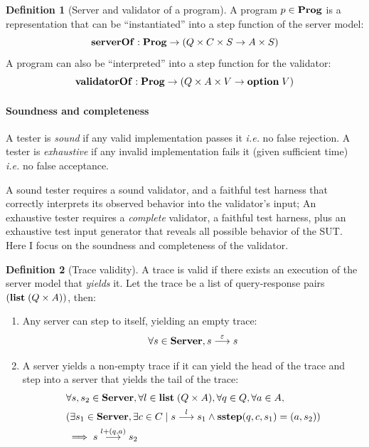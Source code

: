 \documentclass{article}
\theoremstyle{definition}
\newtheorem{definition}{Definition}
\newcommand{\Server}{\ottkw{Server}}
\newcommand{\sstep}{\ottkw{sstep}}
\newcommand{\option}{\ottkw{option}\;}
\newcommand{\List}{\ottkw{list}\;}
\newcommand{\nil}{\varepsilon}
\newcommand{\yields}[3]{#1\overset{#2}{\longrightarrow}#3}
\newcommand{\Prog}{\ottkw{Prog}}
\newcommand{\serverOf}{\ottkw{serverOf}}
\newcommand{\validatorOf}{\ottkw{validatorOf}}
\begin{document}
\begin{definition}[Server and validator of a program]
  A program $p\in\Prog$ is a representation that can be ``instantiated'' into a step
  function of the server model:
  \[ \serverOf:\Prog\to (Q\times C\times S\to A\times S) \]
  A program can also be ``interpreted'' into a step function for the validator:
  \[ \validatorOf:\Prog\to (Q\times A \times V\to \option V) \]
\end{definition}

\paragraph{Soundness and completeness}
A tester is {\em sound} if any valid implementation passes it {\it i.e.} no
false rejection.  A tester is {\em exhaustive} if any invalid implementation
fails it (given sufficient time) {\it i.e.} no false acceptance.

A sound tester requires a sound validator, and a faithful test harness
that correctly interprets its observed behavior into the validator's input; An
exhaustive tester requires a {\em complete} validator, a faithful test harness,
plus an exhaustive test input generator that reveals all possible behavior of
the SUT.  Here I focus on the soundness and completeness of the validator.

\begin{definition}[Trace validity]
  A trace is valid if there exists an execution of the server model that {\em
    yields} it.  Let the trace be a list of query-response pairs $(\List
  (Q\times A))$, then:
  \begin{enumerate}
  \item Any server can step to itself, yielding an empty trace:
    \[\forall s\in\Server, \yields{s}{\nil}{s}\]
  \item A server yields a non-empty trace if it can yield the head of the trace
    and step into a server that yields the tail of the trace:
    \begin{align*}
      &\forall s,s_2\in\Server,\forall l\in\List(Q\times A),\forall q\in Q,\forall a\in A,\\
      &(\exists s_1\in\Server,\exists c\in C\mid\yields{s}{l}{s_1}\wedge
      \sstep(q,c,s_1)=(a,s_2)) \\
      &\implies \yields{s}{l+(q,a)}{s_2}
    \end{align*}
  \end{enumerate}
\end{definition}
\end{document}
